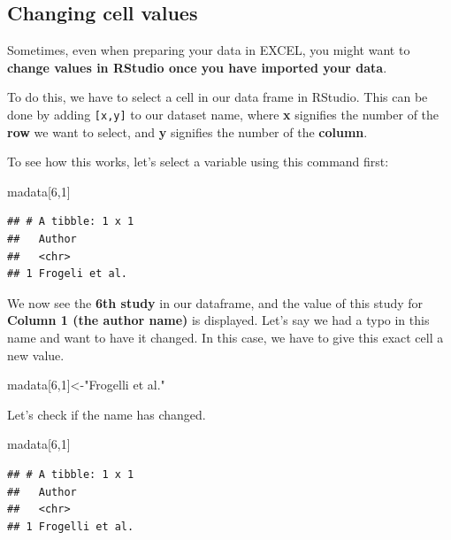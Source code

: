 \documentclass[]{book}
\newenvironment{Shaded}{\begin{snugshade}}{\end{snugshade}}
\newcommand{\DecValTok}[1]{\textcolor[rgb]{0.00,0.00,0.81}{#1}}
\newcommand{\NormalTok}[1]{#1}
\newcommand{\StringTok}[1]{\textcolor[rgb]{0.31,0.60,0.02}{#1}}
\begin{document}
\hypertarget{changing-cell-values}{%
\subsection{Changing cell values}\label{changing-cell-values}}

Sometimes, even when preparing your data in EXCEL, you might want to \textbf{change values in RStudio once you have imported your data}.

To do this, we have to select a cell in our data frame in RStudio. This can be done by adding \texttt{{[}x,y{]}} to our dataset name, where \textbf{x} signifies the number of the \textbf{row} we want to select, and \textbf{y} signifies the number of the \textbf{column}.

To see how this works, let's select a variable using this command first:

\begin{Shaded}
\begin{Highlighting}[]
\NormalTok{madata[}\DecValTok{6}\NormalTok{,}\DecValTok{1}\NormalTok{]}
\end{Highlighting}
\end{Shaded}

\begin{verbatim}
## # A tibble: 1 x 1
##   Author        
##   <chr>         
## 1 Frogeli et al.
\end{verbatim}

We now see the \textbf{6th study} in our dataframe, and the value of this study for \textbf{Column 1 (the author name)} is displayed. Let's say we had a typo in this name and want to have it changed. In this case, we have to give this exact cell a new value.

\begin{Shaded}
\begin{Highlighting}[]
\NormalTok{madata[}\DecValTok{6}\NormalTok{,}\DecValTok{1}\NormalTok{]<-}\StringTok{"Frogelli et al."}
\end{Highlighting}
\end{Shaded}

Let's check if the name has changed.

\begin{Shaded}
\begin{Highlighting}[]
\NormalTok{madata[}\DecValTok{6}\NormalTok{,}\DecValTok{1}\NormalTok{]}
\end{Highlighting}
\end{Shaded}

\begin{verbatim}
## # A tibble: 1 x 1
##   Author         
##   <chr>          
## 1 Frogelli et al.
\end{verbatim}
\end{document}
